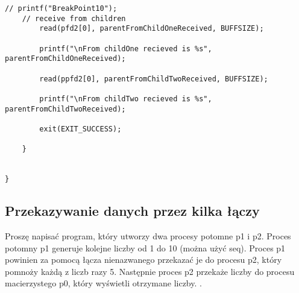 \documentclass[a4paper,15pt]{article}
\newcommand{\assignment}[2]{
    \begin{tcolorbox}[colback=black!5!white,colframe=black,title={Zadanie #1}]
        #2
    \end{tcolorbox}
}
\begin{document}
\begin{lstlisting}[style=CStyle, label=some-code, caption=Komunikacja z kilkoma procesami.]
    // printf("BreakPoint10");
    // receive from children
        read(pfd2[0], parentFromChildOneReceived, BUFFSIZE);

        printf("\nFrom childOne recieved is %s", parentFromChildOneReceived);

        read(ppfd2[0], parentFromChildTwoReceived, BUFFSIZE);

        printf("\nFrom childTwo recieved is %s", parentFromChildTwoReceived);

        exit(EXIT_SUCCESS);

    }


}

\end{lstlisting}

\newpage
\subsection{Przekazywanie danych przez kilka łączy}

\assignment{3.2}{
Proszę napisać program, który utworzy dwa procesy potomne p1 i p2.
Proces potomny p1 generuje kolejne liczby od 1 do 10 (można użyć seq).
Proces p1 powinien za pomocą łącza nienazwanego przekazać je do procesu p2, który pomnoży każdą z liczb razy 5.
Następnie proces p2 przekaże liczby do procesu macierzystego p0, który wyświetli otrzymane liczby. . 
}
\end{document}
